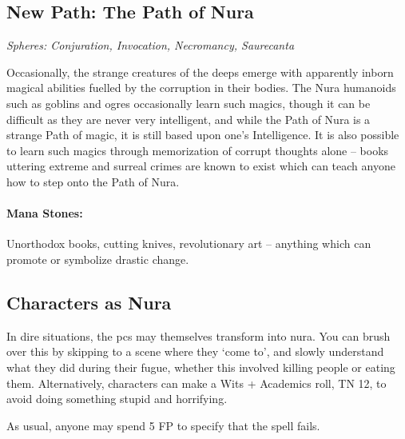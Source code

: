 \begin{multicols}{2}

\subsection{New Path: The Path of Nura}

\textit{Spheres: Conjuration, Invocation, Necromancy, Saurecanta}

\noindent Occasionally, the strange creatures of the deeps emerge with apparently inborn magical abilities fuelled by the corruption in their bodies.
The Nura humanoids such as goblins and ogres occasionally learn such magics, though it can be difficult as they are never very intelligent, and while the Path of Nura is a strange Path of magic, it is still based upon one's Intelligence.
It is also possible to learn such magics through memorization of corrupt thoughts alone -- books uttering extreme and surreal crimes are known to exist which can teach anyone how to step onto the Path of Nura.

\paragraph{Mana Stones:} Unorthodox books, cutting knives, revolutionary art -- anything which can promote or symbolize drastic change.

\subsection{Characters as Nura}

In dire situations, the \glspl{pc} may themselves transform into nura.
You can brush over this by skipping to a scene where they `come to', and slowly understand what they did during their fugue, whether this involved killing people or eating them.
Alternatively, characters can make a Wits + Academics roll, TN 12, to avoid doing something stupid and horrifying.

As usual, anyone may spend 5 FP to specify that the spell fails.

\end{multicols}



